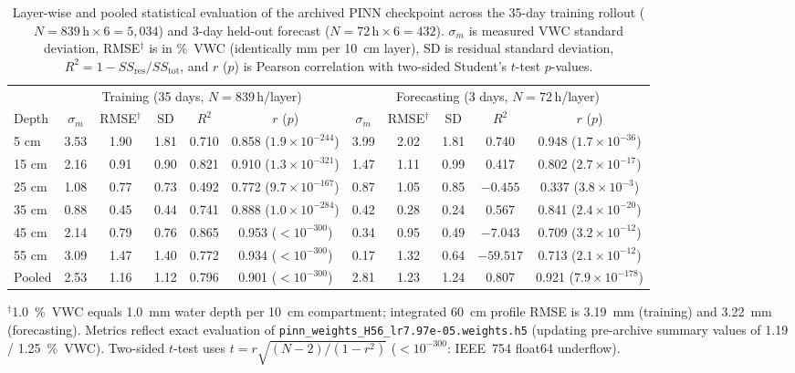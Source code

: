 \documentclass[pdflatex,sn-nature]{sn-jnl}%
\theoremstyle{thmstyleone}%
\theoremstyle{thmstyletwo}%
\theoremstyle{thmstylethree}%
\begin{document}
\begin{table}[!htbp]
\centering
\caption{Layer-wise and pooled statistical evaluation of the archived PINN checkpoint across the 35-day training rollout ($N = 839\,\mathrm{h} \times 6 = 5{,}034$) and 3-day held-out forecast ($N = 72\,\mathrm{h} \times 6 = 432$). $\sigma_m$ is measured VWC standard deviation, RMSE$^\dagger$ is in \si{\%VWC} (identically \si{mm} per \SI{10}{cm} layer), SD is residual standard deviation, $R^2 = 1 - SS_{\mathrm{res}}/SS_{\mathrm{tot}}$, and $r$ ($p$) is Pearson correlation with two-sided Student's $t$-test $p$-values.}
\label{tab:stats_combined}
\fontsize{6.2}{7.8}\selectfont
\setlength{\tabcolsep}{1.8pt}
\begin{tabular}{@{}lcccccccccc@{}}
\toprule
& \multicolumn{5}{c}{Training (35 days, $N=839\,\mathrm{h}$/layer)} & \multicolumn{5}{c}{Forecasting (3 days, $N=72\,\mathrm{h}$/layer)} \\
\cmidrule(lr){2-6}\cmidrule(l){7-11}
Depth & $\sigma_m$ & RMSE$^\dagger$ & SD & $R^2$ & $r$ ($p$) & $\sigma_m$ & RMSE$^\dagger$ & SD & $R^2$ & $r$ ($p$) \\
\midrule
5 \si{cm}  & 3.53 & 1.90 & 1.81 & 0.710 & 0.858 ($1.9\!\times\!10^{-244}$) & 3.99 & 2.02 & 1.81 & 0.740 & 0.948 ($1.7\!\times\!10^{-36}$) \\
15 \si{cm} & 2.16 & 0.91 & 0.90 & 0.821 & 0.910 ($1.3\!\times\!10^{-321}$) & 1.47 & 1.11 & 0.99 & 0.417 & 0.802 ($2.7\!\times\!10^{-17}$) \\
25 \si{cm} & 1.08 & 0.77 & 0.73 & 0.492 & 0.772 ($9.7\!\times\!10^{-167}$) & 0.87 & 1.05 & 0.85 & $-0.455$ & 0.337 ($3.8\!\times\!10^{-3}$) \\
35 \si{cm} & 0.88 & 0.45 & 0.44 & 0.741 & 0.888 ($1.0\!\times\!10^{-284}$) & 0.42 & 0.28 & 0.24 & 0.567 & 0.841 ($2.4\!\times\!10^{-20}$) \\
45 \si{cm} & 2.14 & 0.79 & 0.76 & 0.865 & 0.953 ($<10^{-300}$) & 0.34 & 0.95 & 0.49 & $-7.043$ & 0.709 ($3.2\!\times\!10^{-12}$) \\
55 \si{cm} & 3.09 & 1.47 & 1.40 & 0.772 & 0.934 ($<10^{-300}$) & 0.17 & 1.32 & 0.64 & $-59.517$ & 0.713 ($2.1\!\times\!10^{-12}$) \\
\midrule
Pooled & 2.53 & 1.16 & 1.12 & 0.796 & 0.901 ($<10^{-300}$) & 2.81 & 1.23 & 1.24 & 0.807 & 0.921 ($7.9\!\times\!10^{-178}$) \\
\bottomrule
\end{tabular}
\begin{tablenotes}
\footnotesize
\item $^\dagger$\SI{1.0}{\%VWC} equals \SI{1.0}{mm} water depth per \SI{10}{cm} compartment; integrated \SI{60}{cm} profile RMSE is \SI{3.19}{mm} (training) and \SI{3.22}{mm} (forecasting). Metrics reflect exact evaluation of \texttt{pinn\_weights\_H56\_lr7.97e-05.weights.h5} (updating pre-archive summary values of 1.19 / 1.25~\si{\%VWC}). Two-sided $t$-test uses $t = r\sqrt{(N-2)/(1-r^2)}$ ($<10^{-300}$: IEEE~754 float64 underflow).
\end{tablenotes}
\end{table}
\end{document}
